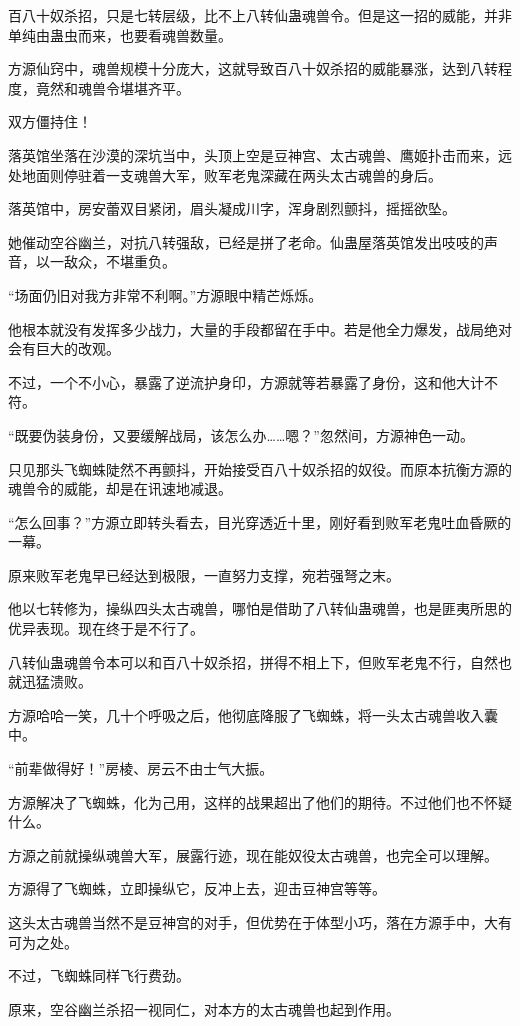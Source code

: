 \begin{this_body}
百八十奴杀招，只是七转层级，比不上八转仙蛊魂兽令。但是这一招的威能，并非单纯由蛊虫而来，也要看魂兽数量。

方源仙窍中，魂兽规模十分庞大，这就导致百八十奴杀招的威能暴涨，达到八转程度，竟然和魂兽令堪堪齐平。

双方僵持住！

落英馆坐落在沙漠的深坑当中，头顶上空是豆神宫、太古魂兽、鹰姬扑击而来，远处地面则停驻着一支魂兽大军，败军老鬼深藏在两头太古魂兽的身后。

落英馆中，房安蕾双目紧闭，眉头凝成川字，浑身剧烈颤抖，摇摇欲坠。

她催动空谷幽兰，对抗八转强敌，已经是拼了老命。仙蛊屋落英馆发出吱吱的声音，以一敌众，不堪重负。

“场面仍旧对我方非常不利啊。”方源眼中精芒烁烁。

他根本就没有发挥多少战力，大量的手段都留在手中。若是他全力爆发，战局绝对会有巨大的改观。

不过，一个不小心，暴露了逆流护身印，方源就等若暴露了身份，这和他大计不符。

“既要伪装身份，又要缓解战局，该怎么办……嗯？”忽然间，方源神色一动。

只见那头飞蜘蛛陡然不再颤抖，开始接受百八十奴杀招的奴役。而原本抗衡方源的魂兽令的威能，却是在讯速地减退。

“怎么回事？”方源立即转头看去，目光穿透近十里，刚好看到败军老鬼吐血昏厥的一幕。

原来败军老鬼早已经达到极限，一直努力支撑，宛若强弩之末。

他以七转修为，操纵四头太古魂兽，哪怕是借助了八转仙蛊魂兽，也是匪夷所思的优异表现。现在终于是不行了。

八转仙蛊魂兽令本可以和百八十奴杀招，拼得不相上下，但败军老鬼不行，自然也就迅猛溃败。

方源哈哈一笑，几十个呼吸之后，他彻底降服了飞蜘蛛，将一头太古魂兽收入囊中。

“前辈做得好！”房棱、房云不由士气大振。

方源解决了飞蜘蛛，化为己用，这样的战果超出了他们的期待。不过他们也不怀疑什么。

方源之前就操纵魂兽大军，展露行迹，现在能奴役太古魂兽，也完全可以理解。

方源得了飞蜘蛛，立即操纵它，反冲上去，迎击豆神宫等等。

这头太古魂兽当然不是豆神宫的对手，但优势在于体型小巧，落在方源手中，大有可为之处。

不过，飞蜘蛛同样飞行费劲。

原来，空谷幽兰杀招一视同仁，对本方的太古魂兽也起到作用。


\end{this_body}
